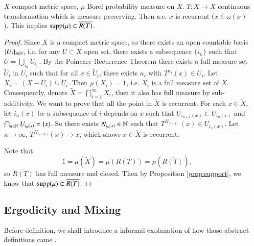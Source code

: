 \documentclass[12pt,a4paper]{article}
\begin{document}
	\begin{proposition}{}{}
		$X$ compact metric space, $\mu$ Borel probability measure on $X$. $T:X\rightarrow X$ continuous transformation which is measure preserving. Then a.e. $x$ is recurrent ($x\in \omega(x)$). This implies $\text{supp}(\mu)\subset \overline{R(T)}$.
	\end{proposition}
	\begin{proof}
		Since $X$ is a compact metric space, so there exists an open countable basis $\{U_i\}_{i\in\mathbb{N}}$, i.e. for any $U\subset X$ open set, there exists a subsequence $\{i_n\}$ such that $U= \bigcup_{i_n}U_{i_n}$. By the Poincare Recurrence Theorem there exists a full measure set $\tilde{U}_i$ in $U_i$ such that for all $x\in \tilde{U}_i$, there exists $n_i$ with $T^{n_i}(x)\in U_i$. Let $X_i = (X-U_i)\cup \tilde{U}_i$. Then $\mu(X_i)=1$, i.e. $X_i$ is a full measure set of $X$. Consequently, denote $\tilde{X}=\bigcap_{i=1}^{\infty} X_i$, then it also has full measure by sub-additivity. We want to prove that all the point in $\tilde{X}$ is recurrent. For each $x\in \tilde{X}$, let $i_n(x)$ be a subsequence of $i$ depends on $x$ such that $U_{i_{n+1}(x)}\subset U_{i_n(x)}$ and $\bigcap_{n\in\mathbb{N}}U_{i_{n}(x)}=\{x\}$. So there exists $N_{i_{n}(x)}\in \mathbb{N}$ such that $T^{N_{i_{n}(x)}}(x)\in U_{i_n(x)}$. Let $n\to \infty$, $T^{N_{i_{n}(x)}}(x)\to x$, which shows $x\in\tilde{X}$ is recurrent. 
		
		Note that 
		$$
		1=\mu(\tilde{X})=\mu(R(T))=\mu(\overline{R(T)}),
		$$
		so $\overline{R(T)}$ has full measure and closed. Then by Proposition \ref{prop:support}, we know that $\text{supp}(\mu)\subset \overline{R(T)}$.
	\end{proof}
	
	
	
	\subsection{Ergodicity and Mixing}\label{sec:ergodic}
	
	Before definition, we shall introduce a informal explanation of how those abstract definitions came \cite{enwiki:1086512997}. 
	
\end{document}
